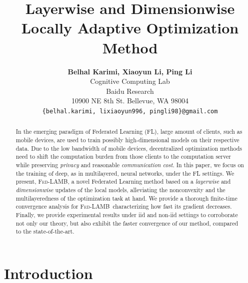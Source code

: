 \documentclass[11pt]{article}
\newcommand{\algo}{\textsc{Fed-LAMB}}
\begin{document}
\title{\bf Layerwise and Dimensionwise Locally Adaptive Optimization Method}


\author{\textbf{Belhal Karimi, Xiaoyun Li, Ping Li}\\
Cognitive Computing Lab\\
Baidu Research\\
10900 NE 8th St. Bellevue, WA 98004\\
\texttt{\{belhal.karimi, lixiaoyun996, pingli98\}@gmail.com}
}

\date{}

\maketitle

\begin{abstract}
In the emerging paradigm of Federated Learning (FL), large amount of clients, such as mobile devices, are used to train possibly high-dimensional models on their respective data.
Due to the low bandwidth of mobile devices, decentralized optimization methods need to shift the computation burden from those clients to the computation server while preserving \emph{privacy} and reasonable \emph{communication cost}.
In this paper, we focus on the training of deep, as in multilayered, neural networks, under the FL settings.
We present, \algo, a novel Federated Learning method based on a \emph{layerwise} and \emph{dimensionwise} updates of the local models, alleviating the nonconvexity and the multilayeredness of the optimization task at hand.
We provide a thorough finite-time convergence analysis for \algo\ characterizing how fast its gradient decreases.
Finally, we provide experimental results under iid and non-iid settings to corroborate not only our theory, but also exhibit the faster convergence of our method, compared to the state-of-the-art.
\end{abstract}


\newpage


\section{Introduction}\label{sec:introduction}
\end{document}
